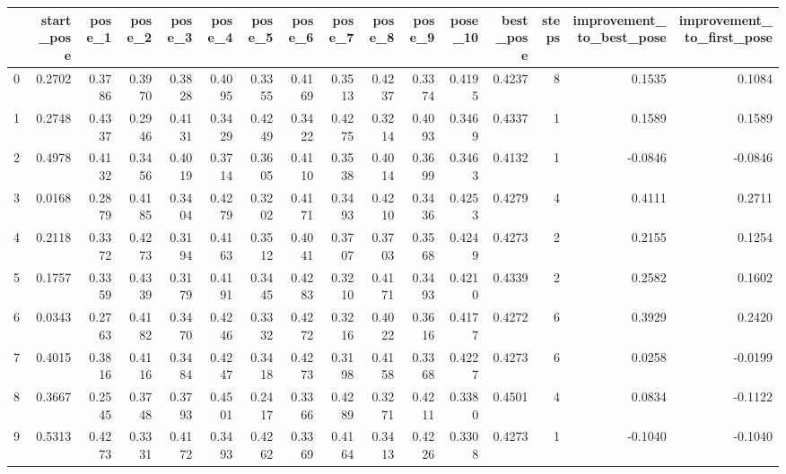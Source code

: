\begin{tabular}{lrrrrrrrrrrrrrrr}
\toprule
{} &  start\_pose &  pose\_1 &  pose\_2 &  pose\_3 &  pose\_4 &  pose\_5 &  pose\_6 &  pose\_7 &  pose\_8 &  pose\_9 &  pose\_10 &  best\_pose &  steps &  improvement\_to\_best\_pose &  improvement\_to\_first\_pose \\
\midrule
0  &      0.2702 &  0.3786 &  0.3970 &  0.3828 &  0.4095 &  0.3355 &  0.4169 &  0.3513 &  0.4237 &  0.3374 &   0.4195 &     0.4237 &      8 &                    0.1535 &                     0.1084 \\
1  &      0.2748 &  0.4337 &  0.2946 &  0.4131 &  0.3429 &  0.4249 &  0.3422 &  0.4275 &  0.3214 &  0.4093 &   0.3469 &     0.4337 &      1 &                    0.1589 &                     0.1589 \\
2  &      0.4978 &  0.4132 &  0.3456 &  0.4019 &  0.3714 &  0.3605 &  0.4110 &  0.3538 &  0.4014 &  0.3699 &   0.3463 &     0.4132 &      1 &                   -0.0846 &                    -0.0846 \\
3  &      0.0168 &  0.2879 &  0.4185 &  0.3404 &  0.4279 &  0.3202 &  0.4171 &  0.3493 &  0.4210 &  0.3436 &   0.4253 &     0.4279 &      4 &                    0.4111 &                     0.2711 \\
4  &      0.2118 &  0.3372 &  0.4273 &  0.3194 &  0.4163 &  0.3512 &  0.4041 &  0.3707 &  0.3703 &  0.3568 &   0.4249 &     0.4273 &      2 &                    0.2155 &                     0.1254 \\
5  &      0.1757 &  0.3359 &  0.4339 &  0.3179 &  0.4191 &  0.3445 &  0.4283 &  0.3210 &  0.4171 &  0.3493 &   0.4210 &     0.4339 &      2 &                    0.2582 &                     0.1602 \\
6  &      0.0343 &  0.2763 &  0.4182 &  0.3470 &  0.4246 &  0.3332 &  0.4272 &  0.3216 &  0.4022 &  0.3616 &   0.4177 &     0.4272 &      6 &                    0.3929 &                     0.2420 \\
7  &      0.4015 &  0.3816 &  0.4116 &  0.3484 &  0.4247 &  0.3418 &  0.4273 &  0.3198 &  0.4158 &  0.3368 &   0.4227 &     0.4273 &      6 &                    0.0258 &                    -0.0199 \\
8  &      0.3667 &  0.2545 &  0.3748 &  0.3793 &  0.4501 &  0.2417 &  0.3366 &  0.4289 &  0.3271 &  0.4211 &   0.3380 &     0.4501 &      4 &                    0.0834 &                    -0.1122 \\
9  &      0.5313 &  0.4273 &  0.3331 &  0.4172 &  0.3493 &  0.4262 &  0.3369 &  0.4164 &  0.3413 &  0.4226 &   0.3308 &     0.4273 &      1 &                   -0.1040 &                    -0.1040 \\

\end{tabular}
